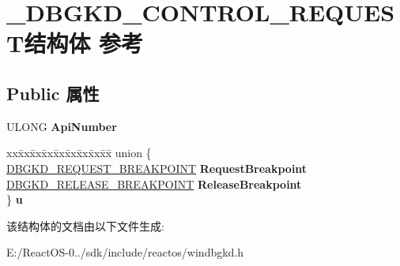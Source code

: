 \hypertarget{struct___d_b_g_k_d___c_o_n_t_r_o_l___r_e_q_u_e_s_t}{}\section{\+\_\+\+D\+B\+G\+K\+D\+\_\+\+C\+O\+N\+T\+R\+O\+L\+\_\+\+R\+E\+Q\+U\+E\+S\+T结构体 参考}
\label{struct___d_b_g_k_d___c_o_n_t_r_o_l___r_e_q_u_e_s_t}
\subsection*{Public 属性}
\begin{DoxyCompactItemize}
\item 
\mbox{\label{struct___d_b_g_k_d___c_o_n_t_r_o_l___r_e_q_u_e_s_t_a779bd55ccdf22e1119d69e3e94e6132a}} 
U\+L\+O\+NG {\bfseries Api\+Number}
\item 
\mbox{\label{struct___d_b_g_k_d___c_o_n_t_r_o_l___r_e_q_u_e_s_t_ac15a888a21e888cfab1ac60a64b538a1}} 
\begin{tabbing}
xx\=xx\=xx\=xx\=xx\=xx\=xx\=xx\=xx\=\kill
union \{\\
\>\hyperlink{struct___d_b_g_k_d___r_e_q_u_e_s_t___b_r_e_a_k_p_o_i_n_t}{DBGKD\_REQUEST\_BREAKPOINT} {\bfseries RequestBreakpoint}\\
\>\hyperlink{struct___d_b_g_k_d___r_e_l_e_a_s_e___b_r_e_a_k_p_o_i_n_t}{DBGKD\_RELEASE\_BREAKPOINT} {\bfseries ReleaseBreakpoint}\\
\} {\bfseries u}\\

\end{tabbing}\end{DoxyCompactItemize}


该结构体的文档由以下文件生成\+:\begin{DoxyCompactItemize}
\item 
E\+:/\+React\+O\+S-\/0../sdk/include/reactos/windbgkd.\+h\end{DoxyCompactItemize}
